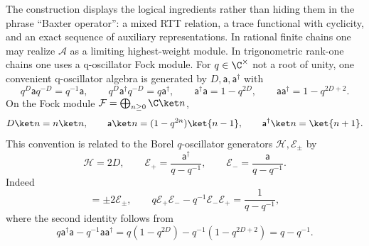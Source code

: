 The construction displays the logical ingredients rather than hiding them in
the phrase ``Baxter operator'': a mixed RTT relation, a trace functional with
cyclicity, and an exact sequence of auxiliary representations.  In rational
finite chains one may realize \(\mathcal A\) as a limiting highest-weight
module.  In trigonometric rank-one chains one uses a q-oscillator Fock
module.  For \(q\in\C^\times\) not a root of unity, one convenient
q-oscillator algebra is generated by \(D,\mathsf a,\mathsf a^\dagger\) with
\[
  q^D\mathsf a q^{-D}=q^{-1}\mathsf a,\qquad
  q^D\mathsf a^\dagger q^{-D}=q\mathsf a^\dagger,\qquad
  \mathsf a^\dagger\mathsf a=1-q^{2D},\qquad
  \mathsf a\mathsf a^\dagger=1-q^{2D+2}.
\]
On the Fock module \(\mathcal F=\bigoplus_{n\ge0}\C\ket n\),
\[
  D\ket n=n\ket n,\qquad
  \mathsf a\ket n=(1-q^{2n})\ket{n-1},\qquad
  \mathsf a^\dagger\ket n=\ket{n+1}.
\]
This convention is related to the Borel \(q\)-oscillator generators
\(\mathcal H,\mathcal E_\pm\) by
\[
  \mathcal H=2D,\qquad
  \mathcal E_+=\frac{\mathsf a^\dagger}{q-q^{-1}},\qquad
  \mathcal E_-=\frac{\mathsf a}{q-q^{-1}}.
\]
Indeed
\begin{equation}
  [\mathcal H,\mathcal E_\pm]=\pm 2\mathcal E_\pm,\qquad
  q\mathcal E_+\mathcal E_-
  -q^{-1}\mathcal E_-\mathcal E_+
  =\frac{1}{q-q^{-1}},
  \label{eq:qosc-borel-generators}
\end{equation}
where the second identity follows from
\[
  q\mathsf a^\dagger\mathsf a-q^{-1}\mathsf a\mathsf a^\dagger
  =
  q(1-q^{2D})-q^{-1}(1-q^{2D+2})
  =q-q^{-1}.
\]

